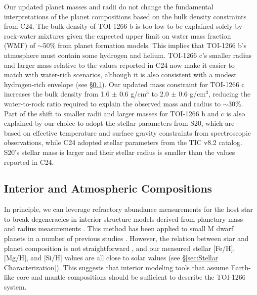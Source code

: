 \documentclass[twocolumn]{aastex631}
\begin{document}
Our updated planet masses and radii do not change the fundamental interpretations of the planet compositions based on the bulk density constraints from C24.  The bulk density of TOI-1266 b is too low to be explained solely by rock-water mixtures given the expected upper limit on water mass fraction (WMF) of $\sim$50\% from planet formation models.  This implies that TOI-1266 b's atmosphere must contain some hydrogen and helium. TOI-1266 c's smaller radius and larger mass relative to the values reported in C24 now make it easier to match with water-rich scenarios, although it is also consistent with a modest hydrogen-rich envelope  (see \S\ref{sec:interior modeling}). Our updated mass constraint for TOI-1266 c increases the bulk density from 1.6 $\pm$ 0.6 g/cm$^3$ to 2.0 $\pm$ 0.6 g/cm$^3$, reducing the water-to-rock ratio required to explain the observed mass and radius to $\sim$30\%. Part of the shift to smaller radii and larger masses for TOI-1266 b and c is also explained by our choice to adopt the stellar parameters from S20, which are based on effective temperature and surface gravity constraints from spectroscopic observations, while C24 adopted stellar parameters from the TIC v8.2 catalog. S20's stellar mass is larger and their stellar radius is smaller than the values reported in C24.

\subsection{Interior and Atmospheric Compositions} \label{sec:interior modeling}

In principle, we can leverage refractory abundance measurements for the host star to break degeneracies in interior structure models derived from planetary mass and radius measurements \citep{Dorn2017}. This method has been applied to small M dwarf planets in a number of previous studies \citep[e.g.,][]{Mortier2020,Leleu2021,Delrez2021,Demangeon2021,Bonfanti2024,Rosario2024,Cointepas2024}.  However, the relation between star and planet composition is not straightforward \citep[e.g.,][]{Plotnykov2020}, and our measured stellar [Fe/H], [Mg/H], and [Si/H] values are all close to solar values (see \S\ref{sec:Stellar Characterization}).
This suggests that interior modeling tools that assume Earth-like core and mantle compositions should be sufficient to describe the TOI-1266 system. 
\end{document}
